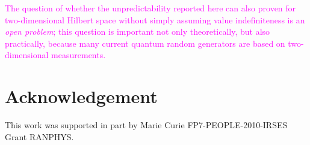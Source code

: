 \documentclass[%
 superscriptaddress,
 preprint,
 showpacs,
 showkeys,
 preprintnumbers,
  amsmath,amssymb,
  aps,
 pra,
  longbibliography,
  floatfix,
 ]{revtex4-1}
\theoremstyle{definition}
\begin{document}
\textcolor{magenta}{
The question of whether the unpredictability reported here can also proven for two-dimensional Hilbert space without simply assuming value indefiniteness is an \emph{open problem};
this question is important not only theoretically, but also practically, because many current quantum random generators are based on two-dimensional  measurements.}

\section*{Acknowledgement} This work was supported in part by Marie Curie FP7-PEOPLE-2010-IRSES Grant RANPHYS.


\end{document}

